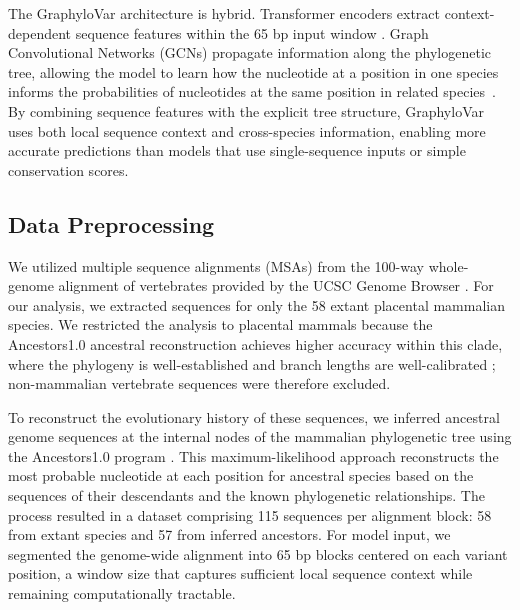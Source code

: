 \documentclass[unnumsec,webpdf,contemporary,large]{oup-authoring-template}%
\theoremstyle{thmstyleone}%
\theoremstyle{thmstyletwo}%
\theoremstyle{thmstylethree}%
\begin{document}
The GraphyloVar architecture is hybrid. Transformer encoders extract context-dependent sequence features within the 65 bp input window \citep{NIPS2017_3f5ee243}. Graph Convolutional Networks (GCNs) propagate information along the phylogenetic tree, allowing the model to learn how the nucleotide at a position in one species informs the probabilities of nucleotides at the same position in related species~\citep{kipf2016semi}. By combining sequence features with the explicit tree structure, GraphyloVar uses both local sequence context and cross-species information, enabling more accurate predictions than models that use single-sequence inputs or simple conservation scores.

\subsection{Data Preprocessing}


We utilized multiple sequence alignments (MSAs) from the 100-way whole-genome alignment of vertebrates provided by the UCSC Genome Browser \citep{blanchette2004aligning, miller200728}. For our analysis, we extracted sequences for only the 58 extant placental mammalian species. We restricted the analysis to placental mammals because the Ancestors1.0 ancestral reconstruction achieves higher accuracy within this clade, where the phylogeny is well-established and branch lengths are well-calibrated \citep{blanchette2004reconstructing}; non-mammalian vertebrate sequences were therefore excluded.

To reconstruct the evolutionary history of these sequences, we inferred ancestral genome sequences at the internal nodes of the mammalian phylogenetic tree using the Ancestors1.0 program \citep{blanchette2004reconstructing, 10.1093/bioinformatics/btp600}. This maximum-likelihood approach reconstructs the most probable nucleotide at each position for ancestral species based on the sequences of their descendants and the known phylogenetic relationships. The process resulted in a dataset comprising 115 sequences per alignment block: 58 from extant species and 57 from inferred ancestors.
For model input, we segmented the genome-wide alignment into 65 bp blocks centered on each variant position, a window size that captures sufficient local sequence context while remaining computationally tractable.
\end{document}
